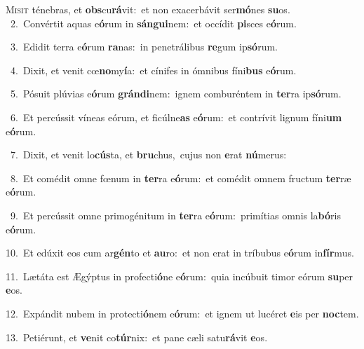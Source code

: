 \lettrine{\initial\textcolor{\initialcolor}{M}}{isit} ténebras, et \textbf{obs}\-cu\-\textbf{rá}\-vit:~\star et non exacerbávit ser\-\textbf{mó}\-nes \textbf{su}\-os.\\
{\numbfont\textcolor{\numbcolor}{~2.}}~Convértit aquas e\-\textbf{ó}\-rum in \textbf{sán}\-\textbf{gui}nem:~\star et occídit \textbf{pi}\-sces e\-\textbf{ó}\-rum.\par
{\numbfont\textcolor{\numbcolor}{~3.}}~Edidit terra e\-\textbf{ó}\-rum \textbf{ra}\-nas:~\star in penetrálibus \textbf{re}\-gum ip\-\textbf{só}\-rum.\par
{\numbfont\textcolor{\numbcolor}{~4.}}~Dixit, et venit cœ\-\textbf{no}\-my\-\textbf{í}\-a:~\star et cínifes in ómnibus fíni\textbf{bus} e\-\textbf{ó}\-rum.\par
{\numbfont\textcolor{\numbcolor}{~5.}}~Pósuit plúvias e\-\textbf{ó}\-rum \textbf{grán}\-\textbf{di}nem:~\star ignem comburéntem in \textbf{ter}\-ra ip\-\textbf{só}\-rum.\par
{\numbfont\textcolor{\numbcolor}{~6.}}~Et percússit víneas eórum, et ficúlne\textbf{as} e\-\textbf{ó}\-rum:~\star et contrívit lignum fíni\textbf{um} e\-\textbf{ó}\-rum.\par
{\numbfont\textcolor{\numbcolor}{~7.}}~Dixit, et venit lo\-\textbf{cús}\-ta, et \textbf{bru}\-chus,~\star cujus non \textbf{e}\-rat \textbf{nú}\-merus:\par
{\numbfont\textcolor{\numbcolor}{~8.}}~Et comédit omne fœnum in \textbf{ter}\-ra e\-\textbf{ó}\-rum:~\star et comédit omnem fructum \textbf{ter}\-ræ e\-\textbf{ó}\-rum.\par
{\numbfont\textcolor{\numbcolor}{~9.}}~Et percússit omne primogénitum in \textbf{ter}\-ra e\-\textbf{ó}\-rum:~\star primítias omnis la\-\textbf{bó}\-ris e\-\textbf{ó}\-rum.\par
{\numbfont\textcolor{\numbcolor}{10.}}~Et edúxit eos cum ar\-\textbf{gén}\-to et \textbf{au}\-ro:~\star et non erat in tríbubus e\-\textbf{ó}\-rum in\-\textbf{fír}\-mus.\par
{\numbfont\textcolor{\numbcolor}{11.}}~Lætáta est Ægýptus in profecti\-\textbf{ó}\-ne e\-\textbf{ó}\-rum:~\star quia incúbuit timor eórum \textbf{su}\-per \textbf{e}\-os.\par
{\numbfont\textcolor{\numbcolor}{12.}}~Expándit nubem in protecti\-\textbf{ó}\-nem e\-\textbf{ó}\-rum:~\star et ignem ut lucéret \textbf{e}\-is per \textbf{noc}\-tem.\par
{\numbfont\textcolor{\numbcolor}{13.}}~Petiérunt, et \textbf{ve}\-nit co\-\textbf{túr}\-nix:~\star et pane cæli satu\-\textbf{rá}\-vit \textbf{e}\-os.\par

